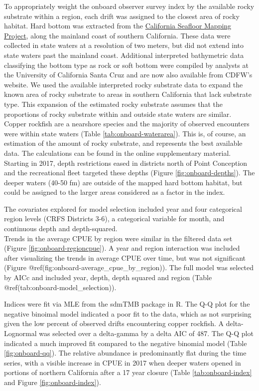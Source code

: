 \documentclass[11pt,
  english,
  letterpaper,
]{article}
\begin{document}
To appropriately weight the onboard observer survey index by the available rocky substrate within a region, each drift was assigned to the closest area of rocky habitat. Hard bottom was extracted from the \href{http://seafloor.otterlabs.org/index.html}{California Seafloor Mapping Project}, along the mainland coast of southern California. These data were collected in state waters at a resolution of two meters, but did not extend into state waters past the mainland coast. Additional interpreted bathymetric data classifying the bottom type as rock or soft bottom were compiled by analysts at the University of California Santa Cruz and are now also available from CDFW's website. We used the available interpreted rocky substrate data to expand the known area of rocky substrate to areas in southern California that lack substrate type. This expansion of the estimated rocky substrate assumes that the proportions of rocky substrate within and outside state waters are similar. Copper rockfish are a nearshore species and the majority of observed encounters were within state waters (Table \ref{tab:onboard-waterarea}). This is, of course, an estimation of the amount of rocky substrate, and represents the best available data. The calculations can be found in the online supplementary material. Starting in 2017, depth restrictions eased in districts north of Point Conception and the recreational fleet targeted these depths (Figure \ref{fig:onboard-depths}). The deeper waters (40-50 fm) are outside of the mapped hard bottom habitat, but could be assigned to the larger areas considered as a factor in the index.

The covariates explored for model selection included year and four categorical region levels (CRFS Districts 3-6), a categorical variable for month, and continuous depth and depth-squared.\\
Trends in the average CPUE by region were similar in the filtered data set (Figure \ref{fig:onboard-regioncpue}). A year and region interaction was included after visualizing the trends in average CPUE over time, but was not significant (Figure @ref(fig:onboard-average\_cpue\_by\_region)). The full model was selected by AICc and included year, depth, depth squared and region (Table @ref(tab:onboard-model\_selection)).

Indices were fit via MLE from the sdmTMB package in R. The Q-Q plot for the negative binoimal model indicated a poor fit to the data, which as not surprising given the low percent of observed drifts encountering copper rockfish. A delta-Lognormal was selected over a delta-gamma by a delta AIC of 487. The Q-Q plot indicated a much improved fit compared to the negative binomial model (Table \ref{fig:onboard-qq}). The relative abundance is predominantly flat during the time series, with a visible increase in CPUE in 2017 when deeper waters opened in portions of northern California after a 17 year closure (Table \ref{tab:onboard-index} and Figure \ref{fig:onboard-index}).
\end{document}
